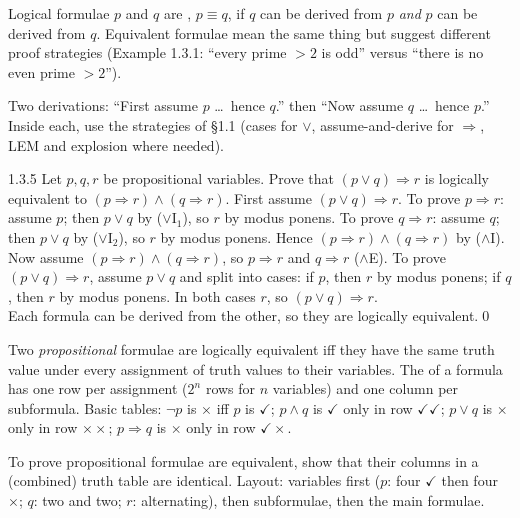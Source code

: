 
\begin{key}
Logical formulae $p$ and $q$ are , $p\equiv q$, if $q$ can be derived from $p$ \emph{and} $p$ can be derived from $q$. Equivalent formulae mean the same thing but suggest different proof strategies (Example 1.3.1: ``every prime $>2$ is odd'' versus ``there is no even prime $>2$'').
\end{key}
\begin{strategy}
Two derivations: ``First assume $p$ \dots\ hence $q$.'' then ``Now assume $q$ \dots\ hence $p$.'' Inside each, use the strategies of \S1.1 (cases for $\vee$, assume-and-derive for $\Rightarrow$, LEM and explosion where needed).
\end{strategy}

\begin{bookex}[essential]{1.3.5}
Let $p,q,r$ be propositional variables. Prove that $(p\vee q)\Rightarrow r$ is logically equivalent to $(p\Rightarrow r)\wedge(q\Rightarrow r)$.
\solution
First assume $(p\vee q)\Rightarrow r$. To prove $p\Rightarrow r$: assume $p$; then $p\vee q$ by ($\vee$I$_1$), so $r$ by modus ponens. To prove $q\Rightarrow r$: assume $q$; then $p\vee q$ by ($\vee$I$_2$), so $r$ by modus ponens. Hence $(p\Rightarrow r)\wedge(q\Rightarrow r)$ by ($\wedge$I).\\
Now assume $(p\Rightarrow r)\wedge(q\Rightarrow r)$, so $p\Rightarrow r$ and $q\Rightarrow r$ ($\wedge$E). To prove $(p\vee q)\Rightarrow r$, assume $p\vee q$ and split into cases: if $p$, then $r$ by modus ponens; if $q$, then $r$ by modus ponens. In both cases $r$, so $(p\vee q)\Rightarrow r$.\\
Each formula can be derived from the other, so they are logically equivalent.\qed
\end{bookex}

\begin{result}
Two \emph{propositional} formulae are logically equivalent iff they have the same truth value under every assignment of truth values to their variables. The  of a formula has one row per assignment ($2^n$ rows for $n$ variables) and one column per subformula. Basic tables: $\neg p$ is $\times$ iff $p$ is $\checkmark$; $p\wedge q$ is $\checkmark$ only in row $\checkmark\checkmark$; $p\vee q$ is $\times$ only in row $\times\times$; $p\Rightarrow q$ is $\times$ only in row $\checkmark\times$.
\end{result}
\begin{strategy}[{Strategy 1.3.11}]
To prove propositional formulae are equivalent, show that their columns in a (combined) truth table are identical. Layout: variables first ($p$: four $\checkmark$ then four $\times$; $q$: two and two; $r$: alternating), then subformulae, then the main formulae.
\end{strategy}

